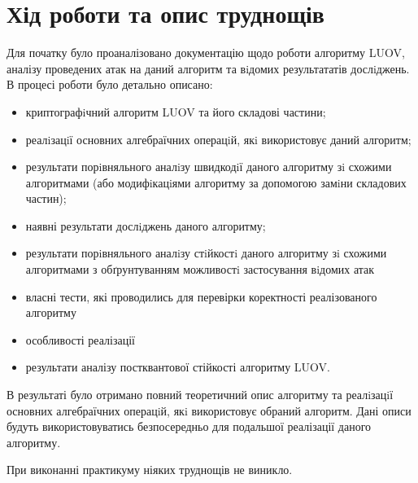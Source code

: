 \section{Хід роботи та опис труднощів}

Для початку було проаналізовано документацію щодо роботи алгоритму LUOV, аналізу проведених атак на даний алгоритм та вiдомих результататів
дослiджень. В процесі роботи було детально описано:
\begin{itemize}
    \item криптографiчний алгоритм LUOV та його складові частини;
    \item реалiзацiї основних алгебраїчних операцiй, якi використовує даний алгоритм;
    \item результати порiвняльного аналiзу швидкодiї даного алгоритму зi схожими алгоритмами (або модифiкацiями алгоритму за допомогою замiни складових частин);
    \item наявні результати дослiджень даного алгоритму;
    \item результати порiвняльного аналiзу стiйкостi даного алгоритму зi схожими алгоритмами з обґрунтуванням можливостi застосування вiдомих атак
    \item власні тести, які проводились для перевірки коректності реалізованого алгоритму
    \item особливості реалізації
    \item результати аналізу постквантової стійкості алгоритму LUOV.
\end{itemize}

В результаті було отримано повний теоретичний опис алгоритму та реалiзацiї основних алгебраїчних операцiй, якi використовує обраний алгоритм. Дані описи будуть використовуватись безпосередньо для подальшої реалізації даного алгоритму.

При виконанні практикуму ніяких труднощів не виникло.

